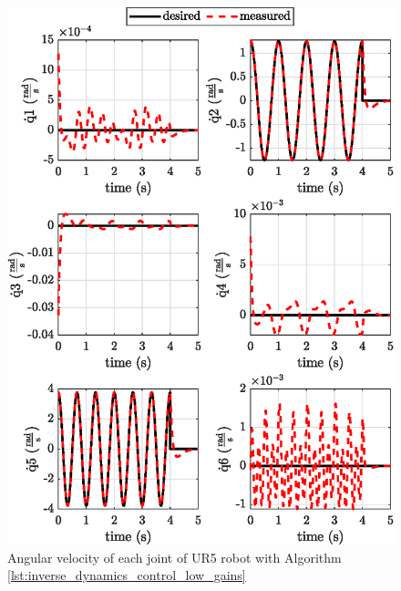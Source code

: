 \begin{figure}[H]
    \centering
    \includegraphics{images/act_2.3/joint_velocity.eps}
    \caption{Angular velocity of each joint of UR5 robot with Algorithm \ref{lst:inverse_dynamics_control_low_gains}}
    \label{fig:act_2.3_joint_velocity}
\end{figure}